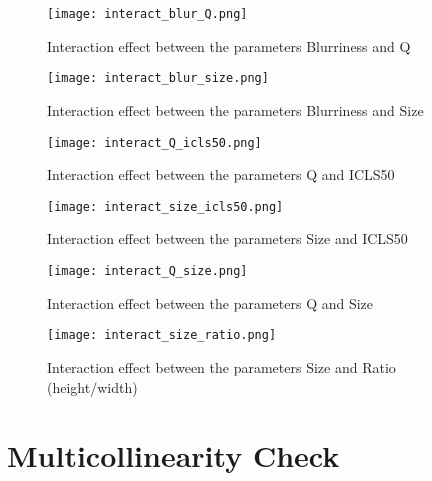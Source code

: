 \documentclass[12pt]{article}
\begin{document}
\begin{figure}[h]
	\begin{center}
		\texttt{[image: interact\_blur\_Q.png]}
	\end{center}
	\caption{Interaction effect between the parameters Blurriness and Q}
	\label{fig:interact_blur_Q}
\end{figure}

\begin{figure}[h]
	\begin{center}
		\texttt{[image: interact\_blur\_size.png]}
	\end{center}
	\caption{Interaction effect between the parameters Blurriness and Size}
	\label{fig:interact_blur_size}
\end{figure}

\begin{figure}[h]
	\begin{center}
		\texttt{[image: interact\_Q\_icls50.png]}
	\end{center}
	\caption{Interaction effect between the parameters Q and ICLS50}
	\label{fig:interact_Q_icls50}
\end{figure}

\begin{figure}[h]
	\begin{center}
		\texttt{[image: interact\_size\_icls50.png]}
	\end{center}
	\caption{Interaction effect between the parameters Size and ICLS50 }
	\label{fig:interact_size_icls50}
\end{figure}

\begin{figure}[h]
	\begin{center}
		\texttt{[image: interact\_Q\_size.png]}
	\end{center}
	\caption{Interaction effect between the parameters Q and Size}
	\label{fig:interact_Q_size}
\end{figure}

\begin{figure}[h]
	\begin{center}
		\texttt{[image: interact\_size\_ratio.png]}
	\end{center}
	\caption{Interaction effect between the parameters Size and Ratio (height/width)}
	\label{fig:interact_size_ratio}
\end{figure}

\clearpage
\section{Multicollinearity Check}\label{Amulticol}
\end{document}
